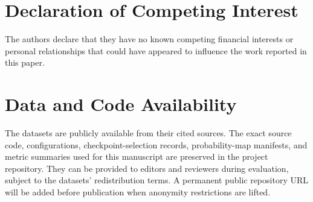 \documentclass[preprint,12pt]{elsarticle}
\begin{document}
\section*{Declaration of Competing Interest}

The authors declare that they have no known competing financial interests or personal relationships that could have appeared to influence the work reported in this paper.

\section*{Data and Code Availability}

The datasets are publicly available from their cited sources. The exact source code, configurations, checkpoint-selection records, probability-map manifests, and metric summaries used for this manuscript are preserved in the project repository. They can be provided to editors and reviewers during evaluation, subject to the datasets' redistribution terms. A permanent public repository URL will be added before publication when anonymity restrictions are lifted.
\end{document}
